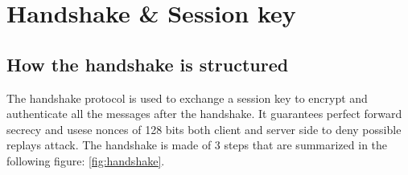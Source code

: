 
\chapter{Handshake \& Session key}
\label{cap:handshake-session-key}

\section{How the handshake is structured}

The handshake protocol is used to exchange a session key to encrypt and authenticate all the messages after the handshake. It guarantees perfect forward secrecy and usese nonces of 128 bits both client and server side to deny possible replays attack. The handshake is made of 3 steps that are summarized in the following figure: \ref{fig:handshake}.

